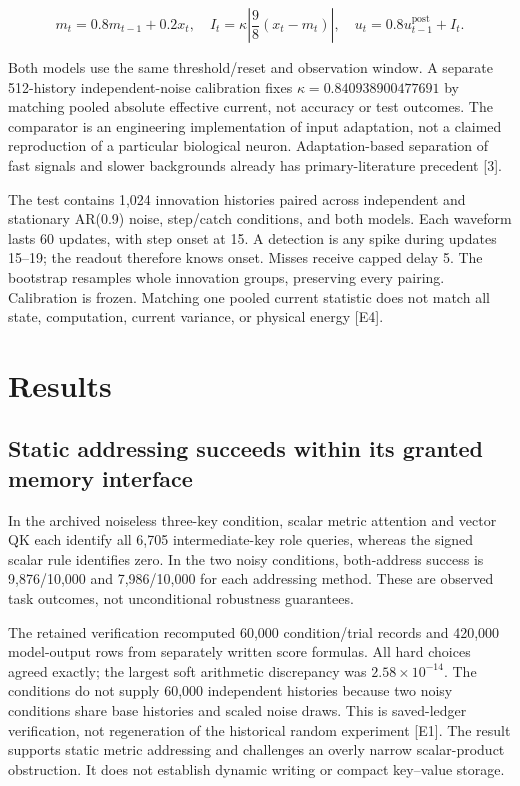 \documentclass[
  10pt,
]{article}
\begin{document}
\[
m_t=0.8m_{t-1}+0.2x_t,\quad
I_t=\kappa\left|\frac98(x_t-m_t)\right|,\quad
u_t=0.8u_{t-1}^{\mathrm{post}}+I_t.
\]

Both models use the same threshold/reset and observation window. A
separate 512-history independent-noise calibration fixes
\(\kappa=0.840938900477691\) by matching pooled absolute effective
current, not accuracy or test outcomes. The comparator is an engineering
implementation of input adaptation, not a claimed reproduction of a
particular biological neuron. Adaptation-based separation of fast
signals and slower backgrounds already has primary-literature precedent
{[}3{]}.

The test contains 1,024 innovation histories paired across independent
and stationary AR(0.9) noise, step/catch conditions, and both models.
Each waveform lasts 60 updates, with step onset at 15. A detection is
any spike during updates 15--19; the readout therefore knows onset.
Misses receive capped delay 5. The bootstrap resamples whole innovation
groups, preserving every pairing. Calibration is frozen. Matching one
pooled current statistic does not match all state, computation, current
variance, or physical energy {[}E4{]}.

\section{Results}\label{results}

\subsection{Static addressing succeeds within its granted memory
interface}\label{static-addressing-succeeds-within-its-granted-memory-interface}

In the archived noiseless three-key condition, scalar metric attention
and vector QK each identify all 6,705 intermediate-key role queries,
whereas the signed scalar rule identifies zero. In the two noisy
conditions, both-address success is 9,876/10,000 and 7,986/10,000 for
each addressing method. These are observed task outcomes, not
unconditional robustness guarantees.

The retained verification recomputed 60,000 condition/trial records and
420,000 model-output rows from separately written score formulas. All
hard choices agreed exactly; the largest soft arithmetic discrepancy was
\(2.58\times10^{-14}\). The conditions do not supply 60,000 independent
histories because two noisy conditions share base histories and scaled
noise draws. This is saved-ledger verification, not regeneration of the
historical random experiment {[}E1{]}. The result supports static metric
addressing and challenges an overly narrow scalar-product obstruction.
It does not establish dynamic writing or compact key--value storage.
\end{document}
